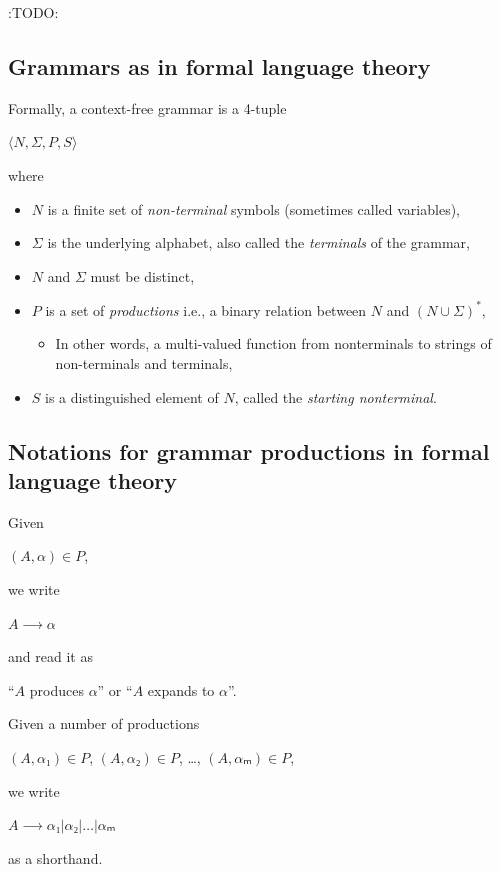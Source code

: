 \documentclass[11pt]{article}
\theoremstyle{definition}
\begin{document}
:TODO:

\subsection{Grammars as in formal language theory}
\label{sec:orgccafe4b}

Formally, a context-free grammar is a 4-tuple
\begin{center}
\(⟨N, Σ, P, S⟩\)
\end{center}
where
\begin{itemize}
\item \(N\) is a finite set of \emph{non-terminal} symbols
(sometimes called variables),
\item \(Σ\) is the underlying alphabet,
also called the \emph{terminals} of the grammar,
\item \(N\) and \(Σ\) must be distinct,
\item \(P\) is a set of \emph{productions} i.e.,
a binary relation between \(N\) and \((N ∪ Σ)^{*}\),
\begin{itemize}
\item In other words, a multi-valued function from
nonterminals to strings of non-terminals and terminals,
\end{itemize}
\item \(S\) is a distinguished element of \(N\), called the \emph{starting nonterminal}.
\end{itemize}

\subsection{Notations for grammar productions in formal language theory}
\label{sec:org295f867}

Given
\begin{center}
\((A, α) ∈ P\),
\end{center}
we write
\begin{center}
\(A ⟶ α\)
\end{center}
and read it as
\begin{center}
“\(A\) produces \(α\)” or “\(A\) expands to \(α\)”.
\end{center}

Given a number of
productions
\begin{center}
\((A, α₁) ∈ P\), \((A, α₂) ∈ P\), …, \((A, αₘ) ∈ P\),
\end{center}
we write
\begin{center}
\(A ⟶ α₁ | α₂ | … | αₘ\)
\end{center}
as a shorthand.
\end{document}
